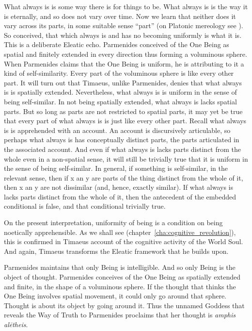 What always is is some way there is for things to be. What always is is the way it is eternally, and so does not vary over time. Now we learn that neither does it vary across its parts, in some suitable sense ``part'' (on Platonic mereology see \citealt{Harte:2002tl}). So conceived, that which always is and has no becoming uniformly is what it is. This is a deliberate Eleatic echo. Parmenides conceived of the One Being as spatial and finitely extended in every direction thus forming a voluminous sphere. When Parmenides claims that the One Being is uniform, he is attributing to it a kind of self-similarity. Every part of the voluminous sphere is like every other part. It will turn out that Timaeus, unlike Parmenides, denies that what always is is spatially extended. Nevertheless, what always is is uniform in the sense of being self-similar. In not being spatially extended, what always is lacks spatial parts. But so long as parts are not restricted to spatial parts, it may yet be true that every part of what always is is just like every other part. Recall what always is is apprehended with an account. An account is discursively articulable, so perhaps what always is has conceptually distinct parts, the parts articulated in the associated account. And even if what always is lacks parts distinct from the whole even in a non-spatial sense, it will still be trivially true that it is uniform in the sense of being self-similar. In general, if something is self-similar, in the relevant sense, then if x an y are parts of the thing distinct from the whole of it, then x an y are not dissimilar (and, hence, exactly similar). If what always is lacks parts distinct from the whole of it, then the antecedent of the embedded conditional is false, and that conditional trivially true.

On the present interpretation, uniformity of being is a condition on being noetically apprehensible. As we shall see (chapter~\ref{cha:cognitive_revolution}), this is confirmed in Timaeus account of the cognitive activity of the World Soul. And again, Timaeus transforms the Eleatic framework that he builds upon. 

Parmenides maintains that only Being is intelligible. And so only Being is the object of thought. Parmenides conceives of the One Being as spatially extended and finite, in the shape of a voluminous sphere. If the thought that thinks the One Being involves spatial movement, it could only go around that sphere. Thought is about its object by going around it. Thus the unnamed Goddess that reveals the Way of Truth to Parmenides proclaims that her thought is \emph{amphis alētheis}.

